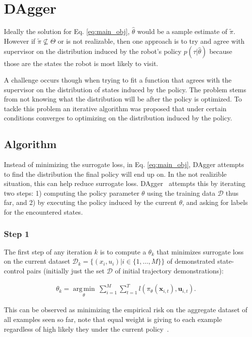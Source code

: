 \documentclass[10pt, conference]{ieeeconf}      %
\DeclareMathOperator*{\argmin}{arg\,min}
\newcommand{\bu}{\mathbf{u}}
\newcommand{\bx}{\mathbf{x}}
\begin{document}
\section{DAgger}\label{sec:DAgger}
Ideally the solution for Eq. \ref{eq:main_obj}, $\hat{\theta}$ would be a sample estimate of $\tilde{\pi}$. However if $\tilde{\pi} \nsubseteq \Theta$ or is not realizable, then one approach is to try and agree with supervisor on the distribution induced by the robot's policy $p(\tau|\hat{\theta})$ because those are the states the robot is most likely to visit. 

A challenge occurs though when trying to fit a function that agrees with the supervisor on the distribution of states induced by the policy. The problem stems from not knowing what the distribution will be after the policy is optimized. To tackle this problem an iterative algorithm was proposed that under certain conditions converges to optimizing on the distribution induced by the policy. 


 \subsection{Algorithm}
Instead of  minimizing the surrogate loss, in Eq. \ref{eq:main_obj},  DAgger attempts to find the distribution the final policy will end up on. In the not realizible situation, this can help reduce surrogate loss. 
DAgger~\cite{ross2010reduction} attempts this by iterating two steps: 1)
computing the policy parameter $\theta$ using the training data $\mathcal{D}$ thus far, and 2) by executing the policy
induced by the current $\theta$, and asking for labels for the encountered states. 
 
\subsubsection{Step 1}
The first step of any iteration $k$ is to compute a $\theta_k$ that minimizes surrogate loss on the current dataset $\mathcal{D}_k=\{(x_i,u_i)|i\in\{1,\ldots,M\}\}$ of demonstrated state-control pairs (initially just the set $\mathcal{D}$ of initial trajectory demonstrations):

 \vspace{-1ex}
\begin{align}\label{eq:super_objj}
\theta_{k} = \underset{\theta}{\argmin} \: \sum_{i=1}^{M} \sum_{t=1}^T  l(\pi_{\theta}(\bx_{i,t}),\bu_{i,t}).
\end{align}

This can be observed as minimizing the empirical risk on the aggregate dataset of all examples seen so far, note that equal weight is giving to each example regardless of high likely they under the current policy~\cite{scholkopf2002learning}. 
 
\end{document}
